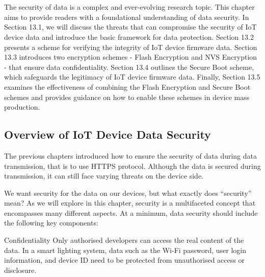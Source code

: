 \documentclass[a4paper,12pt]{book}
\begin{document}

\chapter[Enhanced Device Security Features]{}

\vspace{36pt}
The security of data is a complex and ever-evolving research topic. This chapter aims to provide readers with a foundational understanding of data security. In Section 13.1, we will discuss the threats that can compromise the security of IoT device data and introduce the basic framework for data protection. Section 13.2 presents a scheme for verifying the integrity of IoT device firmware data. Section 13.3 introduces two encryption schemes - Flash Encryption and NVS Encryption - that ensure data confidentiality. Section 13.4 outlines the Secure Boot scheme, which safeguards the legitimacy of IoT device firmware data. Finally, Section 13.5 examines the effectiveness of combining the Flash Encryption and Secure Boot schemes and provides guidance on how to enable these schemes in device mass production.

\section{Overview of IoT Device Data Security}
The previous chapters introduced how to ensure the security of data during data transmission, that is to use HTTPS protocol. Although the data is secured during transmission, it can still face varying threats on the device side.

We want security for the data on our devices, but what exactly does “security” mean? As we will explore in this chapter, security is a multifaceted concept that encompasses many different aspects. At a minimum, data security should include the following key components:

\begin{term}{Confidentiality}
    Only authorised developers can access the real content of the data. In a smart lighting system, data such as the Wi-Fi password, user login information, and device ID need to be protected from unauthorised access or disclosure.
\end{term}
\end{document}
